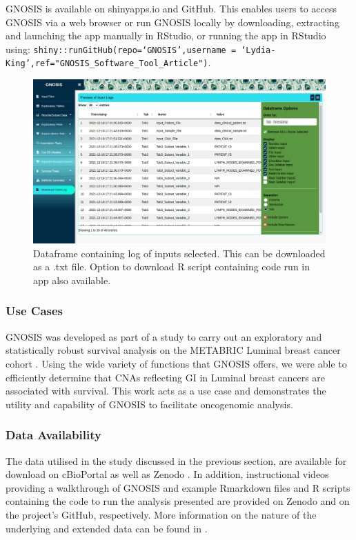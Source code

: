 GNOSIS is available on shinyapps.io and GitHub. This enables users to access GNOSIS via a web browser or run GNOSIS locally by downloading, extracting and launching the app manually in RStudio, or running the app in RStudio using: \texttt{shiny::runGitHub(repo=‘GNOSIS’,username = ‘Lydia-King’,ref="GNOSIS\_Software\_Tool\_Article")}.

\begin{figure}[H]
\vspace{0.2cm}
\center
\includegraphics[width=1\textwidth]{../figures/Chapter_3/GNOSIS_Fig11.png}
\caption[Dataframe containing log of inputs selected.]{Dataframe containing log of inputs selected. This can be downloaded as a .txt file. Option to download R script containing code run in app also available.}
\label{fig:down}
\end{figure}

\subsubsection{Use Cases}
GNOSIS was developed as part of a study to carry out an exploratory and statistically robust survival analysis on the METABRIC Luminal breast cancer cohort \citep{King_2021}. Using the wide variety of functions that GNOSIS offers, we were able to efficiently determine that CNAs reflecting GI in Luminal breast cancers are associated with survival. This work acts as a use case and demonstrates the utility and capability of GNOSIS to facilitate oncogenomic analysis.  

\subsubsection{Data Availability}
The data utilised in the study discussed in the previous section, \cite{King_2021} are available for download on cBioPortal as well as Zenodo \citep{underlyingdata}. In addition, instructional videos providing a walkthrough of GNOSIS and example Rmarkdown files and R scripts containing the code to run the analysis presented are provided on Zenodo \citep{King_2022} and on the project’s GitHub, respectively. More information on the nature of the underlying and extended data can be found in \cite{King_GNOSIS}. 

